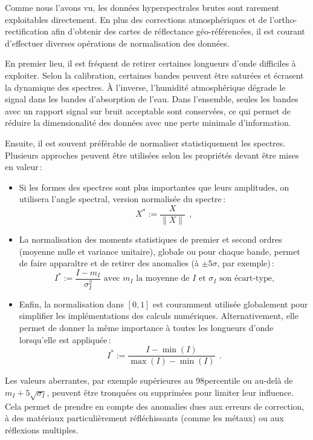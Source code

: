 Comme nous l'avons vu, les données hyperspectrales brutes sont rarement exploitables directement. En plus des corrections atmosphériques et de l'ortho-rectification afin d'obtenir des cartes de réflectance géo-référencées, il est courant d'effectuer diverses opérations de normalisation des données.

En premier lieu, il est fréquent de retirer certaines longueurs d'onde difficiles à exploiter. Selon la calibration, certaines bandes peuvent être saturées et écrasent la dynamique des spectres. À l'inverse, l'humidité atmosphérique dégrade le signal dans les bandes d'absorption de l'eau. Dans l'ensemble, seules les bandes avec un rapport signal sur bruit acceptable sont conservées, ce qui permet de réduire la dimensionalité des données avec une perte minimale d'information.

Ensuite, il est souvent préférable de normaliser statistiquement les spectres. Plusieurs approches peuvent être utilisées selon les propriétés devant être mises en valeur\,:
\begin{itemize}
\item Si les formes des spectres sont plus importantes que leurs amplitudes, on utilisera l'angle spectral, version normalisée du spectre\,:
$$X^* := \frac{X}{\| X \|}~~,$$
\item La normalisation des moments statistiques de premier et second ordres (moyenne nulle et variance unitaire), globale ou pour chaque bande, permet de faire apparaître et de retirer des anomalies (à $\pm5\sigma$, par exemple)\,:
$$I^* := \frac{I - m_I}{\sigma^2_I} \text{ avec } m_I \text{ la moyenne de } I \text{ et } \sigma_I \text{ son écart-type,}$$
\item Enfin, la normalisation dans $[0,1]$ est couramment utilisée globalement pour simplifier les implémentations des calculs numériques. Alternativement, elle permet de donner la même importance à toutes les longueurs d'onde lorsqu'elle est appliquée\,:
$$I^* := \frac{I - \min(I)}{\max(I) - \min(I)}~~.$$
\end{itemize}

Les valeurs aberrantes, par exemple supérieures au 98\ieme percentile ou au-delà de $m_I + 5\sqrt{\sigma_I}$, peuvent être tronquées ou supprimées pour limiter leur influence. Cela permet de prendre en compte des anomalies dues aux erreurs de correction, à des matériaux particulièrement réfléchissants (comme les métaux) ou aux réflexions multiples.

